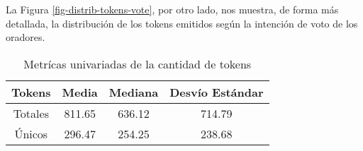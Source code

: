 La Figura \ref{fig-distrib-tokens-vote}, por otro lado, nos muestra,
de forma más detallada, la distribución de los tokens emitidos según
la intención de voto de los oradores.

\begin{table}[h!]
\begin{center}
\begin{tabular}{ |c|c|c|c| }
\hline
Tokens & Media & Mediana & Desvío Estándar \\
\hline\hline
Totales & 811.65 & 636.12 & 714.79 \\
\hline
Únicos & 296.47 & 254.25 & 238.68 \\
\hline
\end{tabular}
\caption{Metrícas univariadas de la cantidad de tokens}
\label{table-tokens}
\end{center}
\end{table}

